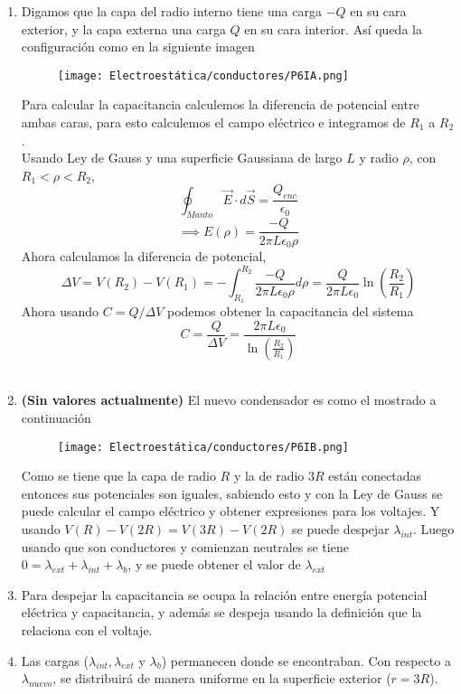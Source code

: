 \begin{enumerate}[label=\alph*)]
    \item Digamos que la capa del radio interno tiene una carga $-Q$ en su cara exterior, y la capa externa una carga $Q$ en su cara interior. Así queda la configuración como en la siguiente imagen
    \begin{figure}[H]
        \centering
        \texttt{[image: Electroestática/conductores/P6IA.png]}
        \label{fig:sol_6_conduc}
    \end{figure}
    
    Para calcular la capacitancia calculemos la diferencia de potencial entre ambas caras, para esto calculemos el campo eléctrico e integramos de $R_1$ a $R_2$.\\
    
    Usando Ley de Gauss y una superficie Gaussiana de largo $L$ y radio $\rho$, con $R_1 < \rho < R_2$,
    \[\oint_{Manto} \Vec{E}\cdot d\Vec{S} = \frac{Q_{enc}}{\epsilon_0}\]
    \[\implies E(\rho) = \frac{-Q}{2 \pi L \epsilon_0 \rho}\]
    Ahora calculamos la diferencia de potencial,
    \[\Delta V = V(R_2) - V(R_1) =-\int_{R_1}^{R_2}\frac{-Q}{2 \pi L \epsilon_0 \rho}d\rho = \frac{Q}{2\pi L \epsilon_0}\ln{\left( \frac{R_2}{R_1} \right)}\]
    Ahora usando $C = Q/\Delta V$ podemos obtener la capacitancia del sistema
    \[C = \frac{Q}{\Delta V} = \frac{2\pi L \epsilon_0}{\ln{\left( \frac{R_2}{R_1} \right)}}\]
    \text{ }\\     
    
    \item \textbf{(Sin valores actualmente)} El nuevo condensador es como el mostrado a continuación
    \begin{figure}[H]
        \centering
        \texttt{[image: Electroestática/conductores/P6IB.png]}
    \end{figure}
    Como se tiene que la capa de radio $R$ y la de radio $3R$ están conectadas entonces sus potenciales son iguales, sabiendo esto y con la Ley de Gauss se puede calcular el campo eléctrico y obtener expresiones para los voltajes. Y usando $V(R) - V(2R) = V(3R) - V(2R)$ se puede despejar $\lambda_{int}$. Luego usando que son conductores y comienzan neutrales se tiene $0 = \lambda_{ext} + \lambda_{int} + \lambda_b$, y se puede obtener el valor de $\lambda_{ext}$
    \item Para despejar la capacitancia se ocupa la relación entre energía potencial eléctrica y capacitancia, y además se despeja usando la definición que la relaciona con el voltaje.
    \item Las cargas ($\lambda_{int}, \lambda_{ext} $ y $ \lambda_b$) permanecen donde se encontraban. Con respecto a $\lambda_{nuevo}$, se distribuirá de manera uniforme en la superficie exterior ($r=3R$).
    
    
\end{enumerate}
\newpage